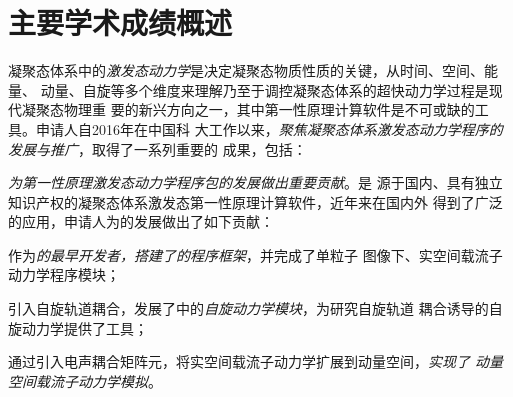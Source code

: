 
\section{主要学术成绩概述}

凝聚态体系中的\emph{激发态动力学}是决定凝聚态物质性质的关键，从时间、空间、能量、
动量、自旋等多个维度来理解乃至于调控凝聚态体系的超快动力学过程是现代凝聚态物理重
要的新兴方向之一，其中第一性原理计算软件是不可或缺的工具。申请人自2016年在中国科
大工作以来，\emph{聚焦凝聚态体系激发态动力学程序的发展与推广}，取得了一系列重要的
成果，包括：
\begin{enumerate}
[
leftmargin=20pt,
label=\textnormal{[\arabic*]}
]
\kaishu{}
  
\item \emph{为第一性原理激发态动力学程序包\hnamd{}的发展做出重要贡献}。\hnamd{}是
  源于国内、具有独立知识产权的凝聚态体系激发态第一性原理计算软件，近年来在国内外
  得到了广泛的应用，申请人为\hnamd{}的发展做出了如下贡献：
  \begin{enumerate*} [label=\textnormal{(\roman*)}]
  \item 作为\emph{\hnamd{}的最早开发者，搭建了\hnamd{}的程序框架}，并完成了单粒子
    图像下、实空间载流子动力学程序模块；
    
  \item 引入自旋轨道耦合，发展了\hnamd{}中的\emph{自旋动力学模块}，为研究自旋轨道
    耦合诱导的自旋动力学提供了工具；
    
  \item 通过引入电声耦合矩阵元，将实空间载流子动力学扩展到动量空间，\emph{实现了
      动量空间载流子动力学模拟}。
    
  \end{enumerate*}

  

\end{enumerate}
